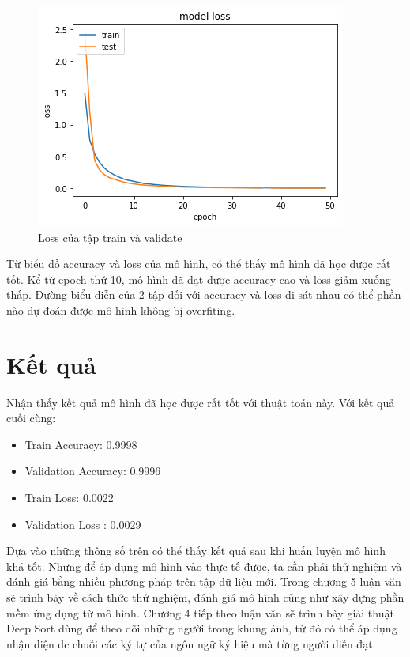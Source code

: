 \FloatBarrier
\begin{figure}[htp]
\begin{center}
\includegraphics[scale=1]{chap4/c4_figs/train_val_l.png}
\end{center}
\caption{Loss của tập train và validate}
\label{fig:pipelineS}
\end{figure}
\FloatBarrier

Từ biểu đồ accuracy và loss của mô hình, có thể thấy mô hình đã học được rất tốt. Kể từ epoch thứ 10, mô hình đã đạt được accuracy cao và loss giảm xuống thấp. Đường biểu diễn của 2 tập đối với accuracy và loss đi sát nhau có thể phần nào dự đoán được mô hình không bị overfiting. 

\section{Kết quả}

Nhận thấy kết quả mô hình đã học được rất tốt với thuật toán này. Với kết quả cuối cùng:
\begin{itemize}
\item Train Accuracy: 0.9998
\item Validation Accuracy: 0.9996
\item Train Loss: 0.0022
\item Validation Loss    : 0.0029
\end{itemize}

Dựa vào những thông số trên có thể thấy kết quả sau khi huấn luyện mô hình khá tốt. Nhưng để áp dụng mô hình vào thực tế được, ta cần phải thử nghiệm và đánh giá bằng nhiều phương pháp trên tập dữ liệu mới. Trong chương 5 luận văn sẽ trình bày về cách thức thử nghiệm, đánh giá mô hình cũng như xây dựng phần mềm ứng dụng từ mô hình.  Chương 4 tiếp theo luận văn sẽ trình bày giải thuật Deep Sort dùng để theo dõi những người trong khung ảnh, từ đó có thể áp dụng nhận diện dc chuỗi các ký tự của ngôn ngữ ký hiệu mà từng người diễn đạt.